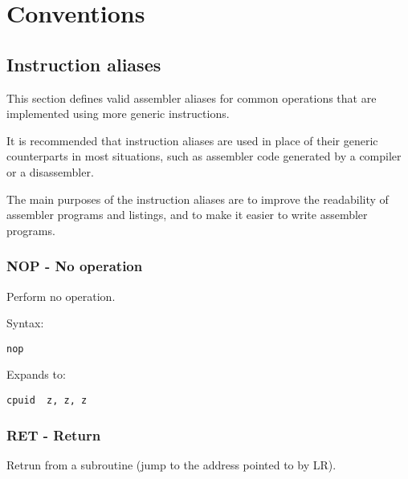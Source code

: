 %

\chapter{Conventions}

\section{Instruction aliases}

This section defines valid assembler aliases for common operations that are
implemented using more generic instructions.

It is recommended that instruction aliases are used in place of their generic
counterparts in most situations, such as assembler code generated by a compiler
or a disassembler.

The main purposes of the instruction aliases are to improve the readability of
assembler programs and listings, and to make it easier to write assembler
programs.

\subsection{NOP - No operation}

Perform no operation.

Syntax:
\begin{lstlisting}[style=assembler]
  nop
\end{lstlisting}

Expands to:
\begin{lstlisting}[style=assembler]
  cpuid  z, z, z
\end{lstlisting}

\subsection{RET - Return}

Retrun from a subroutine (jump to the address pointed to by LR).

